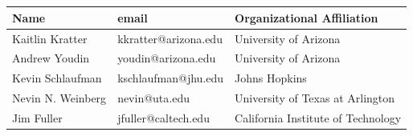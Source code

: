 \documentclass[11pt,letter]{article}
\begin{document}
\rhead{}

\section*{}

\vspace{2cm}

\begin{center}

\begin{tabular}{l@{\quad}l@{\quad}l}
\textbf{Name} & \textbf{email} & \textbf{Organizational Affiliation}\\
\hline
Kaitlin Kratter & kkratter@arizona.edu & University of Arizona\\
Andrew Youdin & youdin@arizona.edu & University of Arizona\\
Kevin Schlaufman & kschlaufman@jhu.edu & Johns Hopkins\\
Nevin N. Weinberg & nevin@uta.edu & University of Texas at Arlington\\
Jim Fuller & jfuller@caltech.edu & California Institute of Technology\\

\end{tabular}

\end{center}
\end{document}
